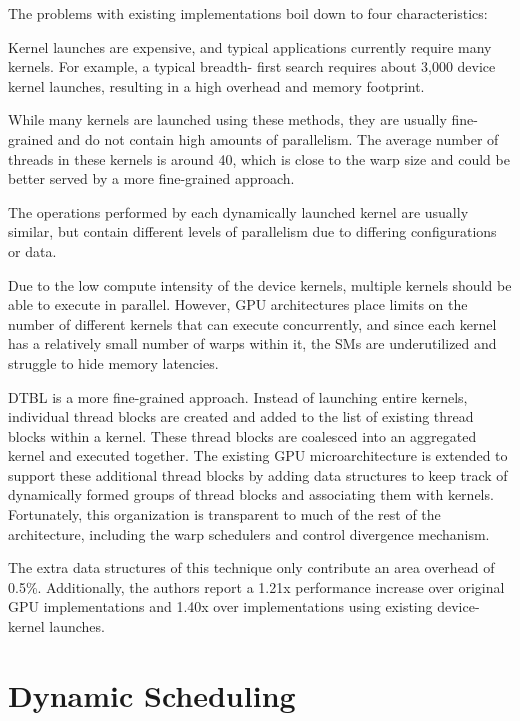 \documentclass[prodmode,acmtecs]{acmsmall} %
\begin{document}
The problems with existing implementations boil down to four characteristics:
\begin{description}
  \setlength\itemsep{0.5em}
  \item [High kernel density] Kernel launches are expensive, and typical
  applications currently require many kernels. For example, a typical breadth-
  first search requires about 3,000 device kernel launches, resulting in a high
  overhead and memory footprint.
  \item [Low compute intensity] While many kernels are launched using these
  methods, they are usually fine-grained and do not contain high amounts of
  parallelism. The average number of threads in these kernels is around 40, which
  is close to the warp size and could be better served by a more fine-grained
  approach.
  \item [Workload similarity] The operations performed by each dynamically
  launched kernel are usually similar, but contain different levels of parallelism
  due to differing configurations or data.
  \item [Low concurrency/scheduling efficiency] Due to the low compute intensity
  of the device kernels, multiple kernels should be able to execute in parallel.
  However, GPU architectures place limits on the number of different kernels that
  can execute concurrently, and since each kernel has a relatively small number of
  warps within it, the SMs are underutilized and struggle to hide memory
  latencies.
\end{description}

DTBL is a more fine-grained approach. Instead of launching entire kernels,
individual thread blocks are created and added to the list of existing thread
blocks within a kernel. These thread blocks are coalesced into an aggregated
kernel and executed together. The existing GPU microarchitecture is extended to
support these additional thread blocks by adding data structures to keep track
of dynamically formed groups of thread blocks and associating them with kernels.
Fortunately, this organization is transparent to much of the rest of the
architecture, including the warp schedulers and control divergence mechanism.

The extra data structures of this technique only contribute an area overhead of
0.5\%. Additionally, the authors report a 1.21x performance increase over
original GPU implementations and 1.40x over implementations using existing
device-kernel launches.

\section{Dynamic Scheduling} \label{sec:scheduling}
\end{document}
